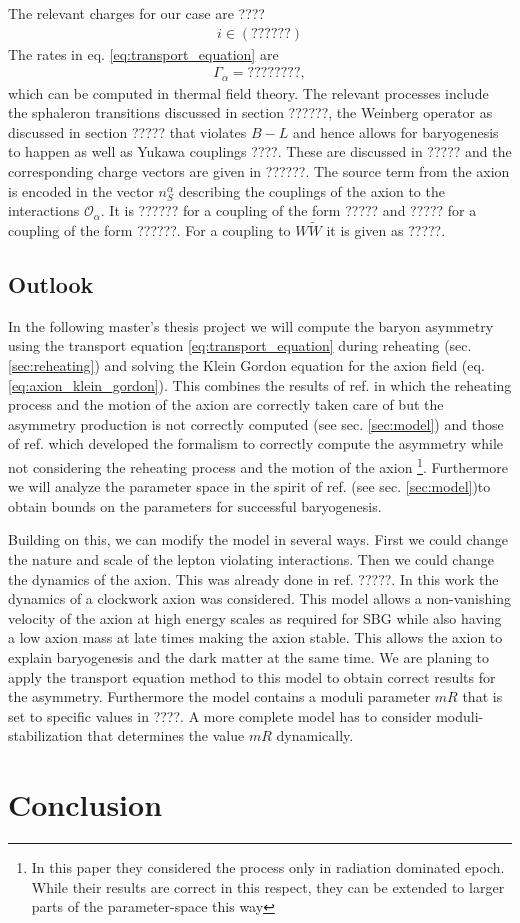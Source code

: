 \documentclass[13pt,a4paper,twoside,titlepage]{article}
\begin{document}
The relevant charges for our case are ????
\begin{align}
i \in (??????)
\end{align}
The rates in eq. \eqref{eq:transport_equation} are
\begin{align}
    \Gamma_\alpha = ????????,
\end{align}
which can be computed in thermal field theory.
The relevant processes include the sphaleron transitions discussed in section ??????,
the Weinberg operator as discussed in section ????? that violates $B - L$ and hence allows for baryogenesis to happen as well as
Yukawa couplings ????. These are discussed in ????? and the corresponding charge vectors are given in ??????.
The source term from the axion is encoded in the vector $n_S^\alpha$ describing the couplings of
the axion to the interactions $\mathcal{O}_\alpha$. It is ?????? for a coupling of the form ?????
and ????? for a coupling of the form ??????.
For a coupling to $W \tilde{W}$ it is given as ?????.


\subsection{Outlook}
\label{sec:outlook}

In the following master's thesis project we will compute the baryon asymmetry using the transport equation \eqref{eq:transport_equation} during reheating (sec. \ref{sec:reheating}) and
solving the Klein Gordon equation for the axion field (eq. \eqref{eq:axion_klein_gordon}).
This combines the results of ref. \cite{Axion_leptogenesis_Kusenko_2015} in which the reheating process and the motion of the axion are correctly taken care of but the asymmetry production
is not correctly computed (see sec. \ref{sec:model}) and those of
ref. \cite{Domcke:2020kcp_Generic_Couplings} which developed the formalism to correctly compute
the asymmetry while not considering the reheating process and the motion of the
axion \footnote{In this paper they considered the process only in radiation dominated epoch. While their results are correct in this respect, they can be extended to larger parts of the parameter-space this way}.
Furthermore we will analyze the parameter space in the spirit of ref. \cite{Axion_leptogenesis_Kusenko_2015} (see sec. \ref{sec:model})to obtain bounds
on the parameters for successful baryogenesis.

Building on this, we can modify the model in several ways.
First we could change the nature and scale of the lepton violating interactions.
Then we could change the dynamics of the axion. This was already done in ref. ?????.
In this work the dynamics of a clockwork axion was considered.
This model allows a non-vanishing velocity of the axion at high energy scales as required for
SBG while also having a low axion mass at late times making the axion stable.
This allows the axion to explain baryogenesis and the dark matter at the same time.
We are planing to apply the transport equation method to this model to obtain correct results
for the asymmetry. Furthermore the model contains a moduli parameter $mR$ that is
set to specific values in ????. A more complete model has to consider moduli-stabilization that determines the value $mR$ dynamically.


\section{Conclusion}
\label{sec:conclusion}


\newpage
\printbibliography
\end{document}

